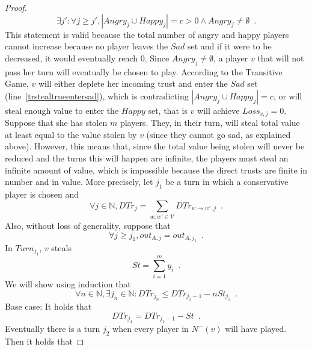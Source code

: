 \documentclass[11pt]{llncs}
\begin{document}
\begin{proof}
       \begin{equation}
          \exists j': \forall j \geq j', |Angry_j \cup Happy_j| = c > 0 \wedge Angry_j \neq \emptyset \enspace.
       \end{equation}
       This statement is valid because the total number of angry and happy players cannot increase because no player leaves
       the $Sad$ set and if it were to be decreased, it would eventually reach 0. Since $Angry_j \neq \emptyset$, a player
       $v$ that will not pass her turn will eventually be chosen to play. According to the Transitive Game, $v$ will either
       deplete her incoming trust and enter the $Sad$ set (line~\ref{trstealtrueentersad}), which is contradicting $|Angry_j
       \cup Happy_j| = c$, or will steal enough value to enter the $Happy$ set, that is $v$ will achieve $Loss_{v, j} = 0$.
       Suppose that she has stolen $m$ players. They, in their turn, will steal total value at least equal to the value
       stolen by $v$ (since they cannot go sad, as explained above). However, this means that, since the total value being
       stolen will never be reduced and the turns this will happen are infinite, the players must steal an infinite amount of
       value, which is impossible because the direct trusts are finite in number and in value. More precisely, let $j_1$ be
       a turn in which a conservative player is chosen and
       \begin{equation}
          \forall j \in \mathbb{N}, DTr_j = \sum\limits_{w,w' \in \mathcal{V}}DTr_{w \rightarrow w', j} \enspace.
       \end{equation}
       Also, without loss of generality, suppose that
       \begin{equation}
          \forall j \geq j_1, out_{A, j} = out_{A, j_1} \enspace.
       \end{equation}
       In $Turn_{j_1}$, $v$ steals
       \begin{equation}
          St = \sum\limits_{i=1}^{m}y_i \enspace.
       \end{equation}
       We will show using induction that
       \begin{equation}
          \forall n \in \mathbb{N}, \exists j_n \in \mathbb{N} : DTr_{j_n} \leq DTr_{j_1-1} - nSt_{j_1} \enspace.
       \end{equation}
       Base case: It holds that
       \begin{equation}
          DTr_{j_1} = DTr_{j_1-1} - St \enspace.
       \end{equation}
       Eventually there is a turn $j_2$ when every player in $N^{-}(v)$ will have played. Then it holds that

\end{proof}
\end{document}
